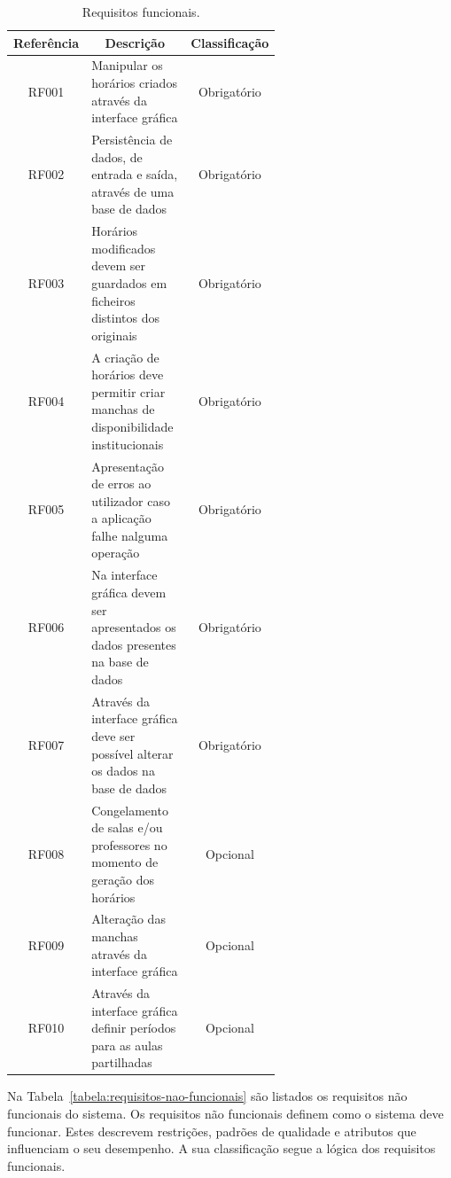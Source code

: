 {
\setlength{\tabcolsep}{.8em}
\begin{table}[H]
    \centering
    \caption{Requisitos funcionais.}
    \label{tabela:requisitos-funcionais}
    \begin{tabular}{c p{0.6\linewidth} c}
        \toprule
        \textbf{Referência} & \multicolumn{1}{c}{\textbf{Descrição}} & \textbf{Classificação} \\ \midrule
        RF001      & Manipular os horários criados através da interface gráfica                             & Obrigatório   \\ \midrule
        RF002      & Persistência de dados, de entrada e saída, através de uma base de dados                & Obrigatório   \\ \midrule
        RF003      & Horários modificados devem ser guardados em ficheiros distintos dos originais          & Obrigatório   \\ \midrule
        RF004      & A criação de horários deve permitir criar manchas de disponibilidade institucionais    & Obrigatório   \\ \midrule
        RF005      & Apresentação de erros ao utilizador caso a aplicação falhe nalguma operação            & Obrigatório   \\ \midrule
        RF006      & Na interface gráfica devem ser apresentados os dados presentes na base de dados        & Obrigatório   \\ \midrule
        RF007      & Através da interface gráfica deve ser possível alterar os dados na base de dados       & Obrigatório   \\ \midrule
        RF008      & Congelamento de salas e/ou professores no momento de geração dos horários              & Opcional      \\ \midrule
        RF009      & Alteração das manchas através da interface gráfica                                     & Opcional      \\ \midrule
        RF010      & Através da interface gráfica definir períodos para as aulas partilhadas                & Opcional      \\ \bottomrule
    \end{tabular}
\end{table}
}

\newpage %

Na Tabela~\ref{tabela:requisitos-nao-funcionais} são listados os requisitos não funcionais do sistema. Os requisitos não funcionais definem como o sistema deve funcionar. Estes descrevem restrições, padrões de qualidade e atributos que influenciam o seu desempenho. A sua classificação segue a lógica dos requisitos funcionais.

